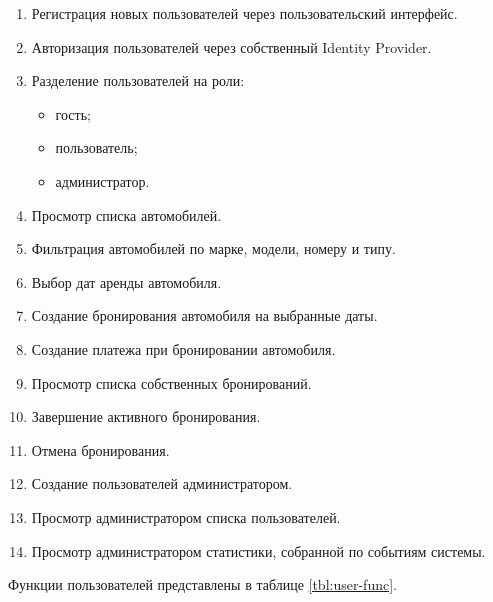 \begin{enumerate}
  \item Регистрация новых пользователей через пользовательский интерфейс.
  \item Авторизация пользователей через собственный Identity Provider.
  \item Разделение пользователей на роли:
  \begin{itemize}
    \item гость;
    \item пользователь;
    \item администратор.
  \end{itemize}
  \item Просмотр списка автомобилей.
  \item Фильтрация автомобилей по марке, модели, номеру и типу.
  \item Выбор дат аренды автомобиля.
  \item Создание бронирования автомобиля на выбранные даты.
  \item Создание платежа при бронировании автомобиля.
  \item Просмотр списка собственных бронирований.
  \item Завершение активного бронирования.
  \item Отмена бронирования.
  \item Создание пользователей администратором.
  \item Просмотр администратором списка пользователей.
  \item Просмотр администратором статистики, собранной по событиям системы.
\end{enumerate}

Функции пользователей представлены в таблице \ref{tbl:user-func}.

